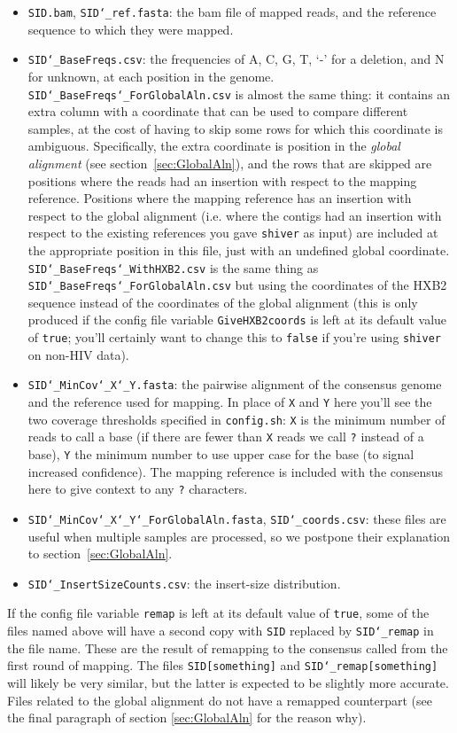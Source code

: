 \documentclass{article}
\newcommand{\shiv}{\c{shiver}\xspace}
\let\c\texttt
\begin{document}
\begin{itemize}
\item \c{SID.bam}, \c{SID\char`_ref.fasta}: the bam file of mapped reads, and the reference sequence to which they were mapped.
\item \c{SID\char`_BaseFreqs.csv}: the frequencies of A, C, G, T, `-' for a deletion, and N for unknown, at each position in the genome.
\c{SID\char`_BaseFreqs\char`_ForGlobalAln.csv} is almost the same thing: it contains an extra column with a coordinate that can be used to compare different samples, at the cost of having to skip some rows for which this coordinate is ambiguous.
Specifically, the extra coordinate is position in the {\it global alignment} (see section~\ref{sec:GlobalAln}), and the rows that are skipped are positions where the reads had an insertion with respect to the mapping reference.
Positions where the mapping reference has an insertion with respect to the global alignment (i.e. where the contigs had an insertion with respect to the existing references you gave \shiv as input) are included at the appropriate position in this file, just with an undefined global coordinate.
\c{SID\char`_BaseFreqs\char`_WithHXB2.csv} is the same thing as \c{SID\char`_BaseFreqs\char`_ForGlobalAln.csv} but using the coordinates of the HXB2 sequence instead of the coordinates of the global alignment (this is only produced if the config file variable \c{GiveHXB2coords} is left at its default value of \c{true}; you'll certainly want to change this to \c{false} if you're using \shiv on non-HIV data).
\item \c{SID\char`_MinCov\char`_X\char`_Y.fasta}: the pairwise alignment of the consensus genome and the reference used for mapping.
In place of \c{X} and \c{Y} here you'll see the two coverage thresholds specified in \c{config.sh}: \c{X} is the minimum number of reads to call a base (if there are fewer than \c{X} reads we call \c{?} instead of a base), \c{Y} the minimum number to use upper case for the base (to signal increased confidence).
The mapping reference is included with the consensus here to give context to any \c{?} characters.
\item \c{SID\char`_MinCov\char`_X\char`_Y\char`_ForGlobalAln.fasta}, \c{SID\char`_coords.csv}: these files are useful when multiple samples are processed, so we postpone their explanation to section~\ref{sec:GlobalAln}.  
\item \c{SID\char`_InsertSizeCounts.csv}: the insert-size distribution.
\end{itemize}
If the config file variable \c{remap} is left at its default value of \c{true}, some of the files named above will have a second copy with \c{SID} replaced by \c{SID\char`_remap} in the file name.
These are the result of remapping to the consensus called from the first round of mapping.
The files \c{SID[something]} and \c{SID\char`_remap[something]} will likely be very similar, but the latter is expected to be slightly more accurate.
Files related to the global alignment do not have a remapped counterpart (see the final paragraph of section \ref{sec:GlobalAln} for the reason why).
\end{document}
